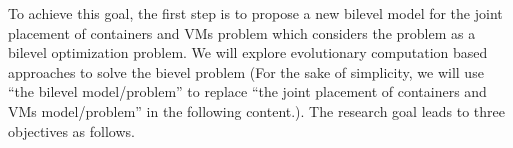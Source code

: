  To achieve this goal, the first step is to propose a new bilevel model for the joint placement of containers and VMs problem which considers the problem as a bilevel optimization problem. We will explore evolutionary computation based approaches to solve the bievel problem (For the sake of simplicity, we will use ``the bilevel model/problem'' to replace ``the joint placement of containers and VMs model/problem'' in the following content.). The research goal leads to three objectives as follows. 


